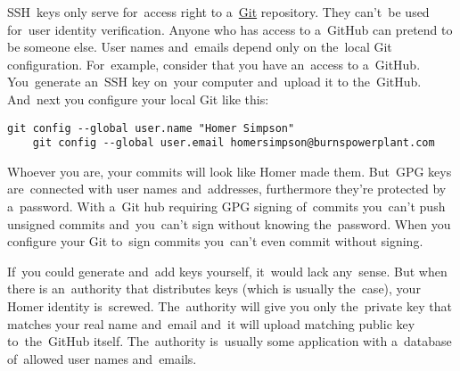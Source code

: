 \label{gitgpg}
SSH~keys only serve for~access right to a~\hyperref[git]{Git} repository. They can't~be used for~user identity verification. Anyone who has access to a~GitHub can pretend to be someone else. User names and~emails depend only on the~local Git configuration. For~example, consider that you have an~access to a~GitHub. You~generate an~SSH key on~your computer and~upload it to the~GitHub. And~next you configure your local Git like this:
\begin{lstlisting}[frame=no]
    git config --global user.name "Homer Simpson"
    git config --global user.email homersimpson@burnspowerplant.com
\end{lstlisting}
\noindent Whoever you are, your commits will look like Homer made them. But~GPG keys are~connected with user names and~addresses, furthermore they're protected by a~password. With a~Git hub requiring GPG signing of~commits you~can't push unsigned commits and~you~can't sign without knowing the~password. When you configure your Git to~sign commits you~can't even commit without signing.

If~you could generate and~add keys yourself, it~would lack any~sense. But when there is an~authority that distributes keys (which is usually the~case), your Homer identity is~screwed. The~authority will give you only the~private key that matches your real name and~email and~it will upload matching public key to~the~GitHub itself. The~authority is~usually some application with a~database of~allowed user names and~emails.
